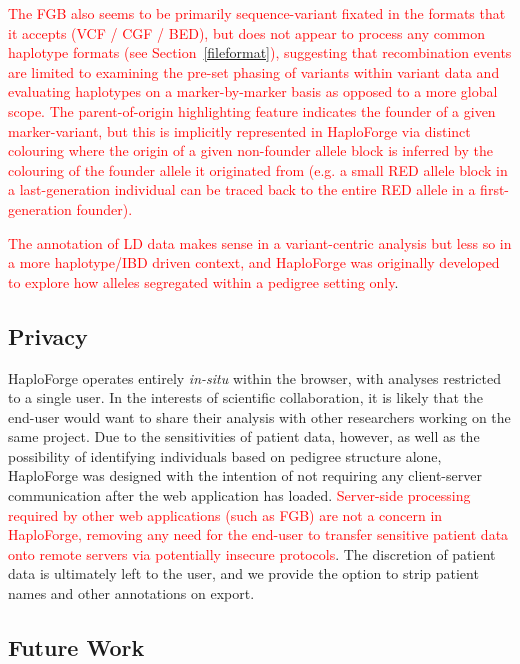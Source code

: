 \documentclass{bioinfo}
\numberwithin{equation}{section}
\def\haplo{{HaploForge}}
\newcommand{\changes}[1]{\textcolor{red}{#1}}
\begin{document}
\changes{The FGB also seems to be primarily sequence-variant fixated in the formats that it accepts (VCF / CGF / BED), but does not appear to process any common haplotype formats (see Section~\ref{fileformat}), suggesting that recombination events are limited to examining the pre-set phasing of variants within variant data and evaluating haplotypes on a marker-by-marker basis as opposed to a more global scope. The parent-of-origin highlighting feature indicates the founder of a given marker-variant, but this is implicitly represented in \haplo{} via distinct colouring where the origin of a given non-founder allele block is inferred by the colouring of the founder allele it originated from (e.g. a small RED allele block in a last-generation individual can be traced back to the entire RED allele in a first-generation founder).}

\changes{The annotation of LD data makes sense in a variant-centric analysis but less so in a more haplotype/IBD driven context, and \haplo{} was originally developed to explore how alleles segregated within a pedigree setting only}.


\subsection{Privacy}

\haplo{} operates entirely \textit{in-situ} within the browser, with analyses restricted to a single user. In the interests of scientific collaboration, it is likely that the end-user would want to share their analysis with other researchers working on the same project. Due to the sensitivities of patient data, however, as well as the possibility of identifying individuals based on pedigree structure alone, \haplo{} was designed with the intention of not requiring any client-server communication after the web application has loaded. \changes{Server-side processing required by other web applications (such as FGB) are not a concern in \haplo{}, removing any need for the end-user to transfer sensitive patient data onto remote servers via potentially insecure protocols}. The discretion of patient data is ultimately left to the user, and we provide the option to strip patient names and other annotations on export.

\enlargethispage{1.8cm}

\subsection{Future Work}
\end{document}
